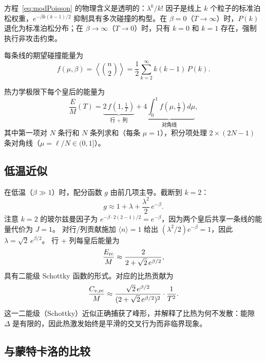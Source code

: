 \documentclass[aps, pre, reprint, amsmath, amssymb, superscriptaddress, floatfix]{revtex4-2}
\begin{document}
方程~\eqref{eq:modPoisson} 的物理含义是透明的：$\lambda^k/k!$ 因子是线上 $k$ 个粒子的标准泊松权重，$e^{-\beta k(k-1)/2}$ 抑制具有多次碰撞的构型。在 $\beta = 0$（$T \to \infty$）时，$P(k)$ 退化为标准泊松分布；在 $\beta \to \infty$（$T \to 0$）时，只有 $k = 0$ 和 $k = 1$ 存在，强制执行非攻击约束。

每条线的期望碰撞能量为
\begin{equation}
  f(\mu, \beta) = \left\langle\binom{n}{2}\right\rangle
  = \frac{1}{2}\sum_{k=2}^{\infty} k(k-1)\,P(k).
  \label{eq:f_def}
\end{equation}

热力学极限下每个皇后的能量为
\begin{equation}
  \frac{E}{M}(T) = \underbrace{2\,f\!\left(1,\tfrac{1}{T}\right)
  }_{\text{行 + 列}}
  + \underbrace{4\int_0^1 f\!\left(\mu,\tfrac{1}{T}\right)d\mu
  }_{\text{对角线}},
  \label{eq:E_MF}
\end{equation}
其中第一项对 $N$ 条行和 $N$ 条列求和（每条 $\mu = 1$），积分项处理 $2 \times (2N-1)$ 条对角线（$\mu = \ell/N \in (0,1]$）。

\subsection{低温近似}

在低温（$\beta \gg 1$）时，配分函数 $g$ 由前几项主导。截断到 $k = 2$：
\begin{equation}
  g \approx 1 + \lambda + \frac{\lambda^2}{2}\,e^{-\beta}.
  \label{eq:g_trunc}
\end{equation}
注意 $k = 2$ 的玻尔兹曼因子为 $e^{-\beta \cdot 2(2-1)/2} = e^{-\beta}$，因为两个皇后共享一条线的能量代价为 $J = 1$。
对行/列贡献施加 $\langle n \rangle = 1$ 给出 $(\lambda^2/2)e^{-\beta} = 1$，因此 $\lambda = \sqrt{2}\,e^{\beta/2}$。
行 + 列每皇后能量为
\begin{equation}
  \frac{E_{\rm rc}}{M} \approx \frac{2}{2 + \sqrt{2}\,e^{\beta/2}},
  \label{eq:Erc_approx}
\end{equation}
具有二能级 Schottky 函数的形式。对应的比热贡献为
\begin{equation}
  \frac{C_{v,\rm rc}}{M} \approx
  \frac{\sqrt{2}\,e^{\beta/2}}{(2 + \sqrt{2}\,e^{\beta/2})^2}
  \cdot \frac{1}{T^2}.
  \label{eq:Cv_rc_approx}
\end{equation}
这一二能级（Schottky）近似正确捕获了峰形，并解释了比热为何不发散：能隙 $\Delta$ 是有限的，因此热激发始终是平滑的交叉行为而非临界现象。

\subsection{与蒙特卡洛的比较}
\end{document}
